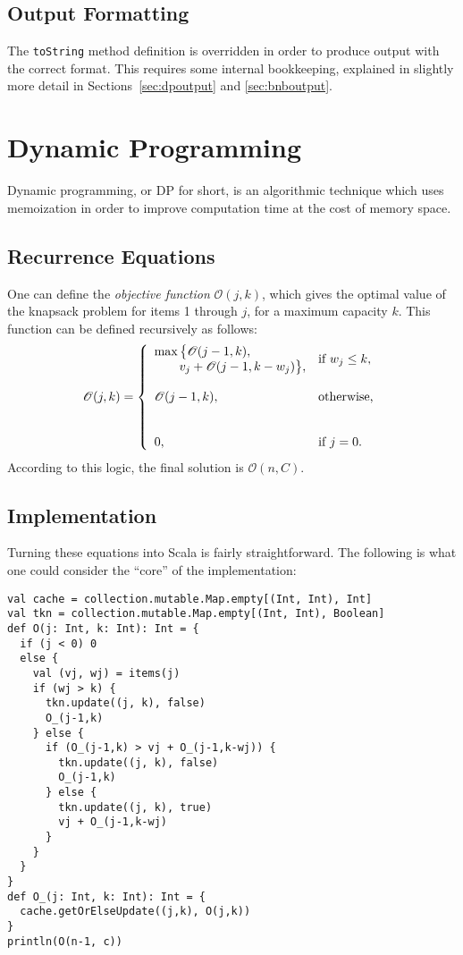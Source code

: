 \documentclass[journal]{IEEEtran}
\newcommand{\scala}[1]{\texttt{#1}}
\begin{document}
\subsection{Output Formatting}
The \scala{toString} method definition is overridden in order to produce output with the correct format.
This requires some internal bookkeeping, explained in slightly more detail in Sections~\ref{sec:dpoutput} and \ref{sec:bnboutput}.

\section{Dynamic Programming}
Dynamic programming, or DP for short, is an algorithmic technique which uses memoization in order to improve computation time at the cost of memory space.

\subsection{Recurrence Equations}
One can define the \emph{objective function} \(\mathscr{O}(j, k)\), which gives the optimal value of the knapsack problem for items 1 through \(j\), for a maximum capacity \(k\).
This function can be defined recursively as follows:
\[
\mathscr{O}(j, k) = \left\{
\begin{array}{ll}
\max\big\{ \mathscr{O}(j-1, k), & \multirow{2}{*}{\(\textnormal{if } w_j \le k,\)}\\
\qquad v_j + \mathscr{O}(j-1, k-w_j) \big\}, & \\\\
\mathscr{O}(j-1, k), & \textnormal{otherwise,}\\\\\\
0, & \textnormal{if } j = 0.
\end{array}
\right.
\]
According to this logic, the final solution is \(\mathscr{O}(n, C)\).
\subsection{Implementation}
Turning these equations into Scala is fairly straightforward.
The following is what one could consider the ``core'' of the implementation:
\begin{verbatim}
val cache = collection.mutable.Map.empty[(Int, Int), Int]
val tkn = collection.mutable.Map.empty[(Int, Int), Boolean]
def O(j: Int, k: Int): Int = {
  if (j < 0) 0
  else {
    val (vj, wj) = items(j)
    if (wj > k) {
      tkn.update((j, k), false)
      O_(j-1,k)
    } else {
      if (O_(j-1,k) > vj + O_(j-1,k-wj)) {
        tkn.update((j, k), false)
        O_(j-1,k)
      } else {
        tkn.update((j, k), true)
        vj + O_(j-1,k-wj)
      }
    }
  }
}
def O_(j: Int, k: Int): Int = {
  cache.getOrElseUpdate((j,k), O(j,k))
}
println(O(n-1, c))
\end{verbatim}
\end{document}
